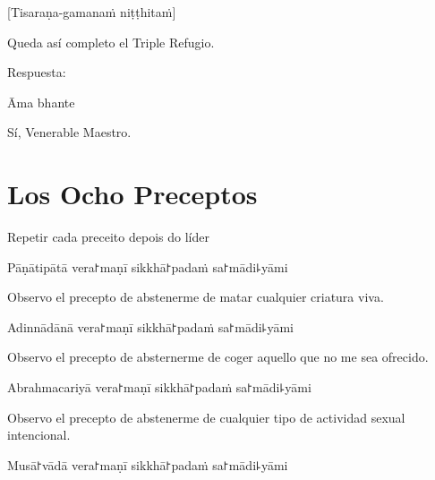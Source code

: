 [Tisaraṇa-gamanaṁ niṭṭhitaṁ]

\begin{english}
  Queda así completo el Triple Refugio.
\end{english}

\begin{instruction}
  Respuesta:
\end{instruction}

Āma bhante

\begin{english}
  Sí, Venerable Maestro.
\end{english}

\chapter{Los Ocho Preceptos}

\begin{instruction}
  Repetir cada preceito depois do líder
\end{instruction}

\begin{precept}
  \setcounter{enumi}{0}
  \item Pāṇātipātā vera꜓maṇī sikkhā꜓padaṁ sa꜓mādi꜕yāmi
\end{precept}

\begin{english}
  Observo el precepto de abstenerme de matar cualquier criatura viva.
\end{english}

\begin{precept}
  \setcounter{enumi}{1}
  \item Adinnādānā vera꜓maṇī sikkhā꜓padaṁ sa꜓mādi꜕yāmi
\end{precept}

\begin{english}
  Observo el precepto de absternerme de coger aquello que no me sea ofrecido.
\end{english}

\begin{precept}
  \setcounter{enumi}{2}
  \item Abrahmacariyā vera꜓maṇī sikkhā꜓padaṁ sa꜓mādi꜕yāmi
\end{precept}

\begin{english}
  Observo el precepto de abstenerme de cualquier tipo de actividad sexual intencional.
\end{english}

\begin{precept}
  \setcounter{enumi}{3}
  \item Musā꜓vādā vera꜓maṇī sikkhā꜓padaṁ sa꜓mādi꜕yāmi
\end{precept}

